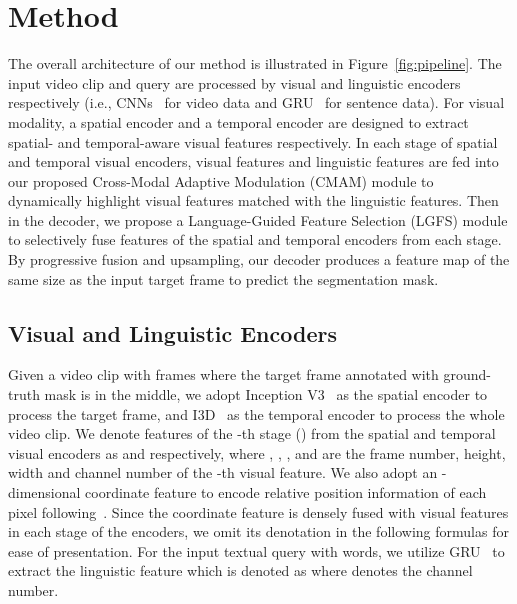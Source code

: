 \documentclass[final]{cvpr}
\begin{document}
\section{Method}
The overall architecture of our method is illustrated in Figure~\ref{fig:pipeline}. 
The input video clip and query are processed by visual and linguistic encoders respectively (i.e., CNNs~\cite{szegedy2016rethinking} for video data and GRU~\cite{cho2014learning} for sentence data). 
For visual modality, a spatial encoder and a temporal encoder are designed to extract spatial- and temporal-aware visual features respectively. 
In each stage of spatial and temporal visual encoders, visual features and linguistic features are fed into our proposed Cross-Modal Adaptive Modulation (CMAM) module to dynamically highlight visual features matched with the linguistic features. 
Then in the decoder, we propose a Language-Guided Feature Selection (LGFS) module to selectively fuse features of the spatial and temporal encoders from each stage. 
By progressive fusion and upsampling, our decoder produces a feature map of the same size as the input target frame to predict the segmentation mask.

\subsection{Visual and Linguistic Encoders}
Given a video clip with  frames where the target frame annotated with ground-truth mask is in the middle, we adopt Inception V3~\cite{szegedy2016rethinking} as the spatial encoder to process the target frame, and I3D~\cite{carreira2017quo} as the temporal encoder to process the whole video clip. 
We denote features of the -th stage () from the spatial and temporal visual encoders as  and  respectively, where , , , and  are the frame number, height, width and channel number of the -th visual feature. 
We also adopt an -dimensional coordinate feature to encode relative position information of each pixel following~\cite{wang2019asymmetric}. 
Since the coordinate feature is densely fused with visual features in each stage of the encoders, we omit its denotation in the following formulas for ease of presentation.
For the input textual query with  words, we utilize GRU~\cite{cho2014learning} to extract the linguistic feature which is denoted as  where  denotes the channel number.
\end{document}
